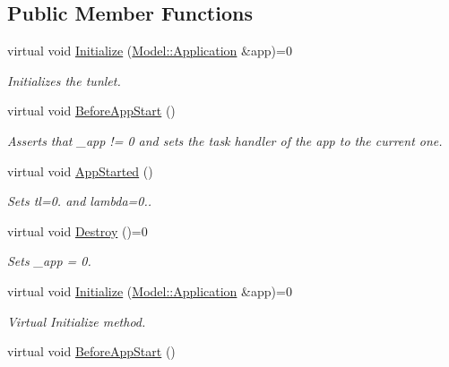 \subsection*{Public Member Functions}
\begin{DoxyCompactItemize}
\item 
virtual void \hyperlink{class_tunlet_aeb84d0844192764dc9aef3cb905c4e7e}{Initialize} (\hyperlink{class_model_1_1_application}{Model\-::\-Application} \&app)=0
\begin{DoxyCompactList}\small\item\em Initializes the tunlet. \end{DoxyCompactList}\item 
\hypertarget{class_tunlet_aa4b222d6267660d272febf75c9abaa6a}{virtual void \hyperlink{class_tunlet_aa4b222d6267660d272febf75c9abaa6a}{Before\-App\-Start} ()}\label{class_tunlet_aa4b222d6267660d272febf75c9abaa6a}

\begin{DoxyCompactList}\small\item\em Asserts that \-\_\-app != 0 and sets the task handler of the app to the current one. \end{DoxyCompactList}\item 
\hypertarget{class_tunlet_a919d9ef63c660560fe23aea88eb236aa}{virtual void \hyperlink{class_tunlet_a919d9ef63c660560fe23aea88eb236aa}{App\-Started} ()}\label{class_tunlet_a919d9ef63c660560fe23aea88eb236aa}

\begin{DoxyCompactList}\small\item\em Sets tl=0. and lambda=0.. \end{DoxyCompactList}\item 
\hypertarget{class_tunlet_a182f5368c0cd635a1ce8fe80ef4c013b}{virtual void \hyperlink{class_tunlet_a182f5368c0cd635a1ce8fe80ef4c013b}{Destroy} ()=0}\label{class_tunlet_a182f5368c0cd635a1ce8fe80ef4c013b}

\begin{DoxyCompactList}\small\item\em Sets \-\_\-app = 0. \end{DoxyCompactList}\item 
\hypertarget{class_tunlet_aeb84d0844192764dc9aef3cb905c4e7e}{virtual void \hyperlink{class_tunlet_aeb84d0844192764dc9aef3cb905c4e7e}{Initialize} (\hyperlink{class_model_1_1_application}{Model\-::\-Application} \&app)=0}\label{class_tunlet_aeb84d0844192764dc9aef3cb905c4e7e}

\begin{DoxyCompactList}\small\item\em Virtual Initialize method. \end{DoxyCompactList}\item 
\hypertarget{class_tunlet_aa4b222d6267660d272febf75c9abaa6a}{virtual void \hyperlink{class_tunlet_aa4b222d6267660d272febf75c9abaa6a}{Before\-App\-Start} ()}\label{class_tunlet_aa4b222d6267660d272febf75c9abaa6a}


\end{DoxyCompactItemize}
